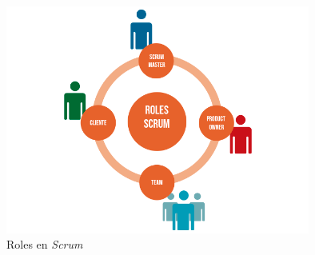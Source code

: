 \begin{figure}[H]
    \centering
    \includegraphics[width=10cm]{Images/roles.png}
    \caption{Roles en \textit{Scrum} \autocite*{ScrumRoles}}
\end{figure}